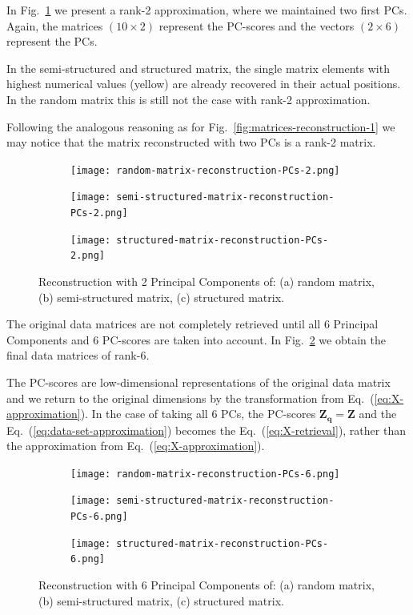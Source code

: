 \documentclass[10pt,twocolumn]{article}
\begin{document}
In Fig.~\ref{fig:matrices-reconstruction-2} we present a rank-2 approximation, where we maintained two first PCs. Again, the matrices $(10 \times 2)$ represent the PC-scores and the vectors $(2 \times 6)$ represent the PCs.

In the semi-structured and structured matrix, the single matrix elements with highest numerical values (yellow) are already recovered in their actual positions. In the random matrix this is still not the case with rank-2 approximation.

Following the analogous reasoning as for Fig.~\ref{fig:matrices-reconstruction-1} we may notice that the matrix reconstructed with two PCs is a rank-2 matrix.


\begin{figure}[H]
\begin{subfigure}[t]{.15\textwidth}
\centering
\texttt{[image: random-matrix-reconstruction-PCs-2.png]}
\caption{ }
\end{subfigure}
\begin{subfigure}[t]{.15\textwidth}
\centering
\texttt{[image: semi-structured-matrix-reconstruction-PCs-2.png]}
\caption{ }
\end{subfigure}
\begin{subfigure}[t]{.15\textwidth}
\centering
\texttt{[image: structured-matrix-reconstruction-PCs-2.png]}
\caption{ }
\end{subfigure}
\caption{Reconstruction with 2 Principal Components of: (a) random matrix, (b) semi-structured matrix, (c) structured matrix.}
\label{fig:matrices-reconstruction-2}
\end{figure}

The original data matrices are not completely retrieved until all 6 Principal Components and 6 PC-scores are taken into account. In Fig.~\ref{fig:matrices-reconstruction-6} we obtain the final data matrices of rank-6.

The PC-scores are low-dimensional representations of the original data matrix and we return to the original dimensions by the transformation from Eq.~(\ref{eq:X-approximation}). In the case of taking all 6 PCs, the PC-scores $\mathbf{Z_q} = \mathbf{Z}$ and the Eq.~(\ref{eq:data-set-approximation}) becomes the Eq.~(\ref{eq:X-retrieval}), rather than the approximation from Eq.~(\ref{eq:X-approximation}).

\begin{figure}[H]
\begin{subfigure}[t]{.15\textwidth}
\centering
\texttt{[image: random-matrix-reconstruction-PCs-6.png]}
\caption{ }
\end{subfigure}
\begin{subfigure}[t]{.15\textwidth}
\centering
\texttt{[image: semi-structured-matrix-reconstruction-PCs-6.png]}
\caption{ }
\end{subfigure}
\begin{subfigure}[t]{.15\textwidth}
\centering
\texttt{[image: structured-matrix-reconstruction-PCs-6.png]}
\caption{ }
\end{subfigure}
\caption{Reconstruction with 6 Principal Components of: (a) random matrix, (b) semi-structured matrix, (c) structured matrix.}
\label{fig:matrices-reconstruction-6}
\end{figure}
\end{document}
